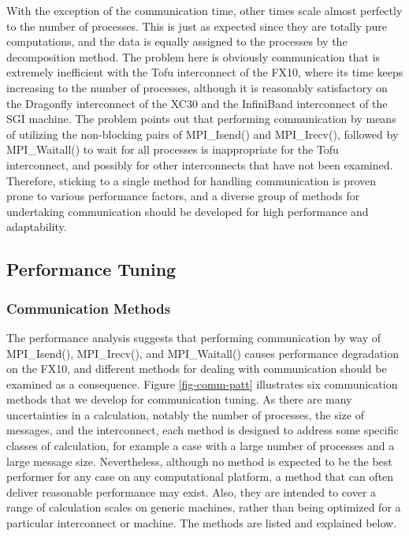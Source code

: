 With the exception of the communication time, other times scale almost perfectly to the number of processes. This is just as expected since they are totally pure computations, and the data is equally assigned to the processes by the decomposition method. The problem here is obviously communication that is extremely inefficient with the Tofu interconnect of the FX10, where its time keeps increasing to the number of processes, although it is reasonably satisfactory on the Dragonfly interconnect of the XC30 and the InfiniBand interconnect of the SGI machine. The problem points out that performing communication by means of utilizing the non-blocking pairs of MPI\_Isend() and MPI\_Irecv(), followed by MPI\_Waitall() to wait for all processes is inappropriate for the Tofu interconnect, and possibly for other interconnects that have not been examined. Therefore, sticking to a single method for handling communication is proven prone to various performance factors, and a diverse group of methods for undertaking communication should be developed for high performance and adaptability.    

\subsection{Performance Tuning}

\subsubsection{Communication Methods}

The performance analysis suggests that performing communication by way of MPI\_Isend(), MPI\_Irecv(), and MPI\_Waitall() causes performance degradation on the FX10, and different methods for dealing with communication should be examined as a consequence.     
Figure \ref{fig-comm-patt} illustrates six communication methods that we develop for communication tuning. As there are many uncertainties in a calculation, notably the number of processes, the size of messages, and the interconnect, each method is designed to address some specific classes of calculation, for example a case with a large number of processes and a large message size. Nevertheless, although no method is expected to be the best performer for any case on any computational platform, a method that can often deliver reasonable performance may exist. Also, they are intended to cover a range of calculation scales on generic machines, rather than being optimized for a particular interconnect or machine. The methods are listed and explained below. 


